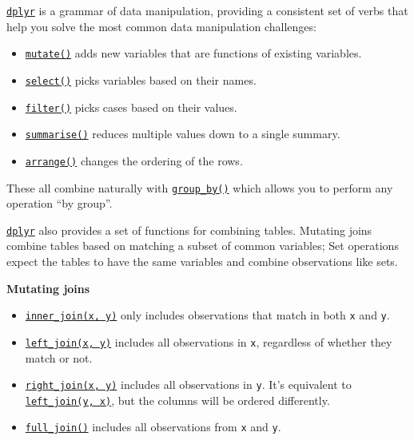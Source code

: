 \documentclass[]{book}
\providecommand{\tightlist}{%
  \setlength{\itemsep}{0pt}\setlength{\parskip}{0pt}}
\theoremstyle{definition}
\theoremstyle{definition}
\theoremstyle{definition}
\theoremstyle{remark}
\begin{document}
\href{http://dplyr.tidyverse.org}{\texttt{dplyr}} is a grammar of data
manipulation, providing a consistent set of verbs that help you solve
the most common data manipulation challenges:

\begin{itemize}
\tightlist
\item
  \href{http://dplyr.tidyverse.org/reference/mutate.html}{\texttt{mutate()}}
  adds new variables that are functions of existing variables.
\item
  \href{http://dplyr.tidyverse.org/reference/select.html}{\texttt{select()}}
  picks variables based on their names.
\item
  \href{http://dplyr.tidyverse.org/reference/filter.html}{\texttt{filter()}}
  picks cases based on their values.
\item
  \href{http://dplyr.tidyverse.org/reference/summarise.html}{\texttt{summarise()}}
  reduces multiple values down to a single summary.
\item
  \href{http://dplyr.tidyverse.org/reference/arrange.html}{\texttt{arrange()}}
  changes the ordering of the rows.
\end{itemize}

These all combine naturally with
\href{http://dplyr.tidyverse.org/reference/group_by.html}{\texttt{group\_by()}}
which allows you to perform any operation ``by group''.

\href{http://dplyr.tidyverse.org}{\texttt{dplyr}} also provides a set of
functions for combining tables. Mutating joins combine tables based on
matching a subset of common variables; Set operations expect the tables
to have the same variables and combine observations like sets.

\textbf{Mutating joins}

\begin{itemize}
\tightlist
\item
  \href{http://dplyr.tidyverse.org/reference/join.html}{\texttt{inner\_join(x,\ y)}}
  only includes observations that match in both \texttt{x} and
  \texttt{y}.
\item
  \href{http://dplyr.tidyverse.org/reference/join.html}{\texttt{left\_join(x,\ y)}}
  includes all observations in \texttt{x}, regardless of whether they
  match or not.
\item
  \href{http://dplyr.tidyverse.org/reference/join.html}{\texttt{right\_join(x,\ y)}}
  includes all observations in \texttt{y}. It's equivalent to
  \href{http://dplyr.tidyverse.org/reference/join.html}{\texttt{left\_join(y,\ x)}},
  but the columns will be ordered differently.
\item
  \href{http://dplyr.tidyverse.org/reference/join.html}{\texttt{full\_join()}}
  includes all observations from \texttt{x} and \texttt{y}.
\end{itemize}
\end{document}
